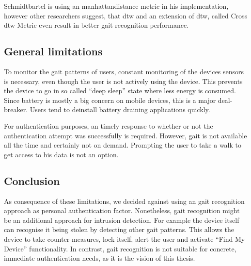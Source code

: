 Schmidtbartel is using an \gls{manhattandistance} metric in his implementation, however other researchers\cite{derawi2013gait} suggest, that \gls{dtw} and an extension of \gls{dtw}, called Cross \gls{dtw} Metric even result in better gait recognition performance.

\subsection{General limitations}
To monitor the gait patterns of users, constant monitoring of the devices sensors is necessary, even though the user is not actively using the device. This prevents the device to go in so called ``deep sleep'' state where less energy is consumed. Since battery is mostly a big concern on mobile devices, this is a major deal-breaker. Users tend to deinstall battery draining applications quickly.

For authentication purposes, an timely response to whether or not the authentication attempt was successfully is required. However, gait is not available all the time and certainly not on demand. Prompting the user to take a walk to get access to his data is not an option.

\subsection{Conclusion}
As consequence of these limitations, we decided against using an gait recognition approach as personal authentication factor. Nonetheless, gait recognition might be an additional approach for intrusion detection. For example the device itself can recognise it being stolen by detecting other gait patterns. This allows the device to take counter-measures, \eg lock itself, alert the user and activate ``Find My Device'' functionality.
In contrast, gait recognition is not suitable for concrete, immediate authentication needs, as it is the vision of this thesis.